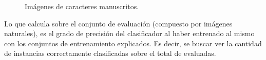 \begin{itemize}
		\begin{figure}[htbp]
			\centering
			\caption[Chars74k manuscritas]{Imágenes de caracteres manuscritos.}
			\label{fig: chars74k-hand}
		\end{figure}
		
	\end{itemize}		
	
	Lo que calcula sobre el conjunto de evaluación (compuesto por imágenes naturales), es el grado de precisión del clasificador al haber entrenado al mismo con los conjuntos de entrenamiento explicados. Es decir, se buscar ver la cantidad de instancias correctamente clasificadas sobre el total de evaluadas.
	
